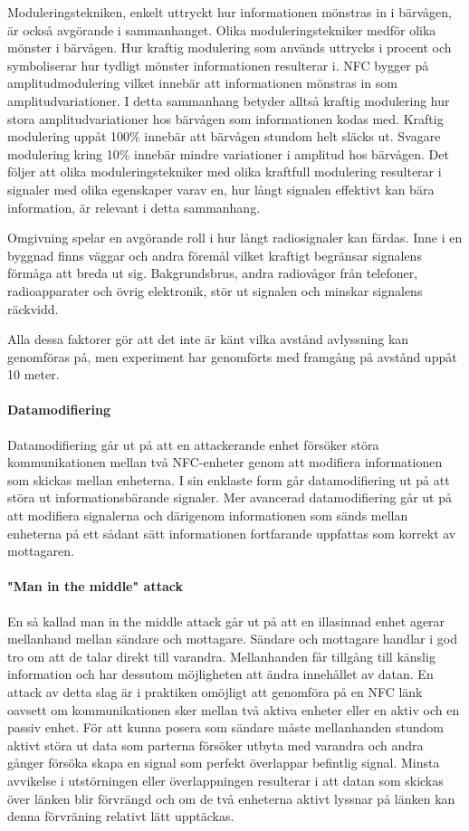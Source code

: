 \documentclass[11pt]{article}
\begin{document}
Moduleringstekniken, enkelt uttryckt hur informationen mönstras in i bärvågen, är också avgörande i sammanhanget. Olika moduleringstekniker medför olika mönster i bärvågen. Hur kraftig modulering som används uttrycks i procent och symboliserar hur tydligt mönster informationen resulterar i. NFC bygger på amplitudmodulering vilket innebär att informationen mönstras in som amplitudvariationer. I detta sammanhang betyder alltså kraftig modulering hur stora amplitudvariationer hos bärvågen som informationen kodas med. Kraftig modulering uppåt 100\% innebär att bärvågen stundom helt släcks ut. Svagare modulering kring 10\% innebär mindre variationer i amplitud hos bärvågen. Det följer att olika moduleringstekniker med olika kraftfull modulering resulterar i signaler med olika egenskaper varav en, hur långt signalen effektivt kan bära information, är relevant i detta sammanhang.

Omgivning spelar en avgörande roll i hur långt radiosignaler kan färdas. Inne i en byggnad finns väggar och andra föremål vilket kraftigt begränsar signalens förmåga att breda ut sig. Bakgrundsbrus, andra radiovågor från telefoner, radioapparater och övrig elektronik, stör ut signalen och minskar signalens räckvidd.

Alla dessa faktorer gör att det inte är känt vilka avstånd avlyssning kan genomföras på, men experiment har genomförts med framgång på avstånd uppåt 10 meter. 


\paragraph{Datamodifiering}
Datamodifiering går ut på att en attackerande enhet försöker störa kommunikationen mellan två NFC-enheter genom att modifiera informationen som skickas mellan enheterna. I sin enklaste form går datamodifiering ut på att störa ut  informationsbärande signaler. Mer avancerad datamodifiering går ut på att modifiera signalerna och därigenom informationen som sänds mellan enheterna på ett sådant sätt informationen fortfarande uppfattas som korrekt av mottagaren. 

\paragraph{"Man in the middle" attack}
En så kallad man in the middle attack går ut på att en illasinnad enhet agerar mellanhand mellan sändare och mottagare. Sändare och mottagare handlar i god tro om att de talar direkt till varandra. Mellanhanden får tillgång till känslig information och har dessutom möjligheten att ändra innehållet av datan. En attack av detta slag är i praktiken omöjligt att genomföra på en NFC länk oavsett om kommunikationen sker mellan två aktiva enheter eller en aktiv och en passiv enhet. För att kunna posera som sändare måste mellanhanden stundom aktivt störa ut data som parterna försöker utbyta med varandra och andra gånger försöka skapa en signal som perfekt överlappar befintlig signal. Minsta avvikelse i utstörningen eller överlappningen resulterar i att datan som skickas över länken blir förvrängd och om de två enheterna aktivt lyssnar på länken kan denna förvräning relativt lätt upptäckas. 
\end{document}
